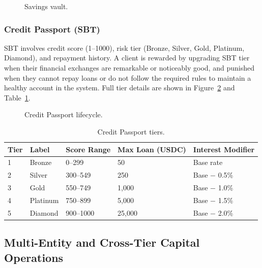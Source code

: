 \begin{figure}[H]
\centering
{}
\caption[Savings vault]{Savings vault.}
\label{fig:savings-vault}
\end{figure}

\subsubsection{Credit Passport (SBT)}
\label{sec:credit-passport}

SBT involves credit score (1--1000), risk tier (Bronze, Silver, Gold, Platinum, Diamond), and repayment history. A client is rewarded by upgrading SBT tier when their financial exchanges are remarkable or noticeably good, and punished when they cannot repay loans or do not follow the required rules to maintain a healthy account in the system. Full tier details are shown in Figure~\ref{fig:credit-passport} and Table~\ref{tab:credit-tiers}.

\begin{figure}[H]
\centering
{}
\caption[Credit Passport lifecycle]{Credit Passport lifecycle.}
\label{fig:credit-passport}
\end{figure}

\begin{table}[H]
\centering
\caption[Credit Passport tiers]{Credit Passport tiers.}
\label{tab:credit-tiers}
\begin{tabular}{p{0.8cm}p{2.2cm}p{2.6cm}p{3.2cm}p{3.8cm}}
\toprule
\tableheadcolor
\textbf{Tier} & \textbf{Label} & \textbf{Score Range} & \textbf{Max Loan (USDC)} & \textbf{Interest Modifier} \\
\midrule
1 & Bronze & 0--299 & 50 & Base rate \\
2 & Silver & 300--549 & 250 & Base $-$ 0.5\% \\
3 & Gold & 550--749 & 1,000 & Base $-$ 1.0\% \\
4 & Platinum & 750--899 & 5,000 & Base $-$ 1.5\% \\
5 & Diamond & 900--1000 & 25,000 & Base $-$ 2.0\% \\
\bottomrule
\end{tabular}
\end{table}


\subsection{Multi-Entity and Cross-Tier Capital Operations}
\label{sec:multi-entity}

